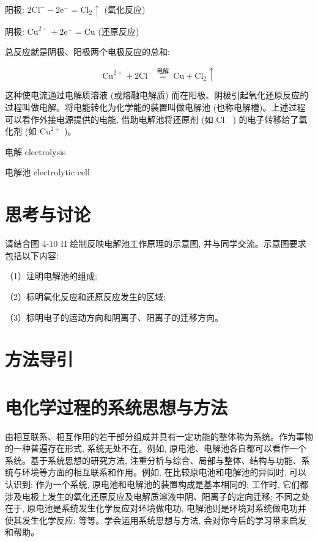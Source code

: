 \documentclass[10pt]{article}
\begin{document}
阳极: \(2{\mathrm{{Cl}}}^{ - } - 2{\mathrm{e}}^{ - } = {\mathrm{{Cl}}}_{2} \uparrow\) (氧化反应)

阴极: \({\mathrm{{Cu}}}^{2 + } + 2{\mathrm{e}}^{ - } = \mathrm{{Cu}}\) (还原反应)

总反应就是阴极、阳极两个电极反应的总和:

\[
{\mathrm{{Cu}}}^{2 + } + 2{\mathrm{{Cl}}}^{ - }\overset{\text{ 电解 }}{ = }\mathrm{{Cu}} + {\mathrm{{Cl}}}_{2} \uparrow
\]

这种使电流通过电解质溶液 (或熔融电解质) 而在阳极、阴极引起氧化还原反应的过程叫做电解。将电能转化为化学能的装置叫做电解池 (也称电解槽)。上述过程可以看作外接电源提供的电能, 借助电解池将还原剂 (如 \({\mathrm{{Cl}}}^{ - }\) ) 的电子转移给了氧化剂 (如 \({\mathrm{{Cu}}}^{2 + }\) )。

\begin{mdframed}

电解 electrolysis

电解池 electrolytic cell

\end{mdframed}

\section*{思考与讨论}

请结合图 4-10 II 绘制反映电解池工作原理的示意图, 并与同学交流。示意图要求包括以下内容:

（1）注明电解池的组成;

（2）标明氧化反应和还原反应发生的区域;

（3）标明电子的运动方向和阴离子、阳离子的迁移方向。


\section*{方法导引}

\section*{电化学过程的系统思想与方法}

由相互联系、相互作用的若干部分组成并具有一定功能的整体称为系统。作为事物的一种普遍存在形式, 系统无处不在。例如, 原电池、电解池各自都可以看作一个系统。基于系统思想的研究方法, 注重分析与综合、局部与整体、结构与功能、系统与环境等方面的相互联系和作用。例如, 在比较原电池和电解池的异同时, 可以认识到: 作为一个系统, 原电池和电解池的装置构成是基本相同的; 工作时, 它们都涉及电极上发生的氧化还原反应及电解质溶液中阴、阳离子的定向迁移; 不同之处在于, 原电池是系统发生化学反应对环境做电功, 电解池则是环境对系统做电功并使其发生化学反应; 等等。学会运用系统思想与方法, 会对你今后的学习带来启发和帮助。
\end{document}
